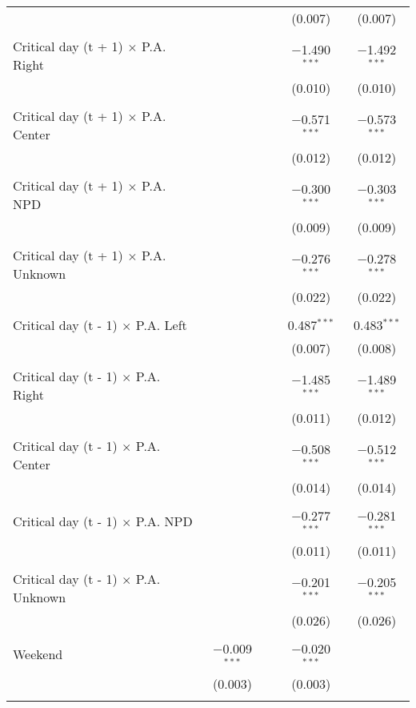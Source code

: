\documentclass[
]{article}
\begin{document}
\begin{table}[!htbp]
{\begin{tabular}{@{\extracolsep{5pt}}lcccc}
  &  &  & (0.007) & (0.007) \\ 
  & & & & \\ 
 Critical day (t + 1) $\times$ P.A. Right &  &  & $-$1.490$^{***}$ & $-$1.492$^{***}$ \\ 
  &  &  & (0.010) & (0.010) \\ 
  & & & & \\ 
 Critical day (t + 1) $\times$ P.A. Center &  &  & $-$0.571$^{***}$ & $-$0.573$^{***}$ \\ 
  &  &  & (0.012) & (0.012) \\ 
  & & & & \\ 
 Critical day (t + 1) $\times$ P.A. NPD &  &  & $-$0.300$^{***}$ & $-$0.303$^{***}$ \\ 
  &  &  & (0.009) & (0.009) \\ 
  & & & & \\ 
 Critical day (t + 1) $\times$ P.A. Unknown &  &  & $-$0.276$^{***}$ & $-$0.278$^{***}$ \\ 
  &  &  & (0.022) & (0.022) \\ 
  & & & & \\ 
 Critical day (t - 1) $\times$ P.A. Left &  &  & 0.487$^{***}$ & 0.483$^{***}$ \\ 
  &  &  & (0.007) & (0.008) \\ 
  & & & & \\ 
 Critical day (t - 1) $\times$ P.A. Right &  &  & $-$1.485$^{***}$ & $-$1.489$^{***}$ \\ 
  &  &  & (0.011) & (0.012) \\ 
  & & & & \\ 
 Critical day (t - 1) $\times$ P.A. Center &  &  & $-$0.508$^{***}$ & $-$0.512$^{***}$ \\ 
  &  &  & (0.014) & (0.014) \\ 
  & & & & \\ 
 Critical day (t - 1) $\times$ P.A. NPD &  &  & $-$0.277$^{***}$ & $-$0.281$^{***}$ \\ 
  &  &  & (0.011) & (0.011) \\ 
  & & & & \\ 
 Critical day (t - 1) $\times$ P.A. Unknown &  &  & $-$0.201$^{***}$ & $-$0.205$^{***}$ \\ 
  &  &  & (0.026) & (0.026) \\ 
  & & & & \\ 
 Weekend & $-$0.009$^{***}$ &  & $-$0.020$^{***}$ &  \\ 
  & (0.003) &  & (0.003) &  \\ 
  & & & & \\ 

\end{tabular}}
\end{table}
\end{document}
